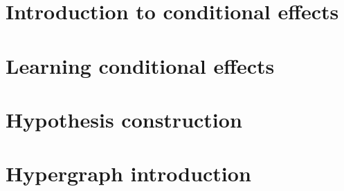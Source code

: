 \documentclass[Master.tex]{subfiles}
\begin{document}
\section{Introduction to conditional effects}
    

\section{Learning conditional effects}
    

\section{Hypothesis construction}
    

\section{Hypergraph introduction}
    

% 	
%
%     
%
% 	
%
% 	
\end{document}
